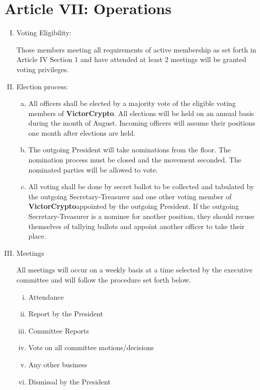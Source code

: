 \documentclass[11pt]{article}
\newcommand{\orgname}{\textbf{VictorCrypto}}
\begin{document}
    \section{Article VII: Operations}

    \begin{enumerate}[I.]
        \item Voting Eligibility:

        Those members meeting all requirements of active membership as set forth in Article IV Section 1 and have
        attended at least 2 meetings will be granted voting privileges.

        \item Election process:
        \begin{enumerate}
            [a)]
            \item All officers shall be elected by a majority vote of the eligible voting members of \orgname.
            All elections will be held on an annual basis during the month of August.
            Incoming officers will assume their positions one month after elections are held.
            \item The outgoing President will take nominations from the floor.
            The nomination process must be closed and the movement seconded.
            The nominated parties will be allowed to vote.
            \item All voting shall be done by secret ballot to be collected and tabulated by the outgoing
            Secretary-Treasurer and one other voting member of \orgname appointed by the outgoing President.
            If the outgoing Secretary-Treasurer is a nominee for another position, they should recuse themselves of tallying ballots and appoint another officer to take their place.
        \end{enumerate}
        \item Meetings

        All meetings will occur on a weekly basis at a time selected by the executive committee and will follow the procedure set forth below.

        \begin{enumerate}
            [i)]
            \item Attendance
            \item Report by the President
            \item Committee Reports
            \item Vote on all committee motions/decisions
            \item Any other business
            \item Dismissal by the President
        \end{enumerate}

    \end{enumerate}
\end{document}
